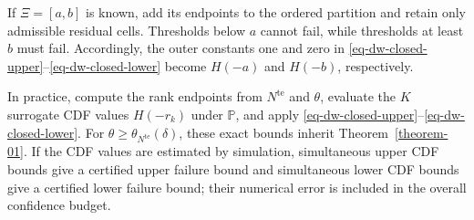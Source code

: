 \documentclass[review,11pt,3p,authoryear,nopreprintline]{elsarticle}
\begin{document}
\begin{remark}
  \label{rem-interval-support}
  If $\Xi=[a,b]$ is known, add its endpoints to the ordered partition and retain only admissible residual cells. Thresholds below $a$ cannot fail, while thresholds at least $b$ must fail. Accordingly, the outer constants one and zero in \eqref{eq-dw-closed-upper}--\eqref{eq-dw-closed-lower} become $H(-a)$ and $H(-b)$, respectively.
\end{remark}

In practice, compute the rank endpoints from $N^{\mathrm{te}}$ and $\theta$, evaluate the $K$ surrogate CDF values $H(-r_k)$ under $\mathbb P$, and apply \eqref{eq-dw-closed-upper}--\eqref{eq-dw-closed-lower}. For $\theta\ge\theta_{N^{\mathrm{te}}}(\delta)$, these exact bounds inherit Theorem~\ref{theorem-01}. If the CDF values are estimated by simulation, simultaneous upper CDF bounds give a certified upper failure bound and simultaneous lower CDF bounds give a certified lower failure bound; their numerical error is included in the overall confidence budget.



\end{document}
